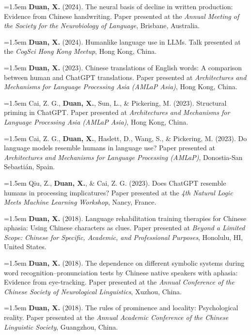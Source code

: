 \documentclass[11pt,a4paper]{article}
\begin{document}
\hangindent=1.5em  \textbf{Duan, X.} (2024). The neural basis of decline in written production: Evidence from Chinese handwriting. Paper presented at the \textit{Annual Meeting of the Society for the Neurobiology of Language}, Brisbane, Australia.

\hangindent=1.5em  \textbf{Duan, X.} (2024). Humanlike language use in LLMs. Talk presented at the \textit{CogSci Hong Kong Meetup}, Hong Kong, China.

\hangindent=1.5em  \textbf{Duan, X.} (2023). Chinese translations of English words: A comparison between human and ChatGPT translations. Paper presented at \textit{Architectures and Mechanisms for Language Processing Asia (AMLaP Asia)}, Hong Kong, China.

\hangindent=1.5em  Cai, Z. G., \textbf{Duan, X.}, Sun, L., \& Pickering, M. (2023). Structural priming in ChatGPT. Paper presented at \textit{Architectures and Mechanisms for Language Processing Asia (AMLaP Asia)}, Hong Kong, China.

\hangindent=1.5em  Cai, Z. G., \textbf{Duan, X.}, Haslett, D., Wang, S., \& Pickering, M. (2023). Do language models resemble humans in language use? Paper presented at \textit{Architectures and Mechanisms for Language Processing (AMLaP)}, Donostia-San Sebasti\'{a}n, Spain.

\hangindent=1.5em  Qiu, Z., \textbf{Duan, X.}, \& Cai, Z. G. (2023). Does ChatGPT resemble humans in processing implicatures? Paper presented at the \textit{4th Natural Logic Meets Machine Learning Workshop}, Nancy, France.

\hangindent=1.5em  \textbf{Duan, X.} (2018). Language rehabilitation training therapies for Chinese aphasia: Using Chinese characters as clues. Paper presented at \textit{Beyond a Limited Scope: Chinese for Specific, Academic, and Professional Purposes}, Honolulu, HI, United States.

\hangindent=1.5em  \textbf{Duan, X.} (2018). The dependence on different symbolic systems during word recognition--pronunciation tests by Chinese native speakers with aphasia: Evidence from eye-tracking. Paper presented at the \textit{Annual Conference of the Chinese Society of Neurological Linguistics}, Xuzhou, China.

\hangindent=1.5em  \textbf{Duan, X.} (2018). The rules of prominence and locality: Psychological reality. Paper presented at the \textit{Annual Academic Conference of the Chinese Linguistic Society}, Guangzhou, China.
\end{document}
